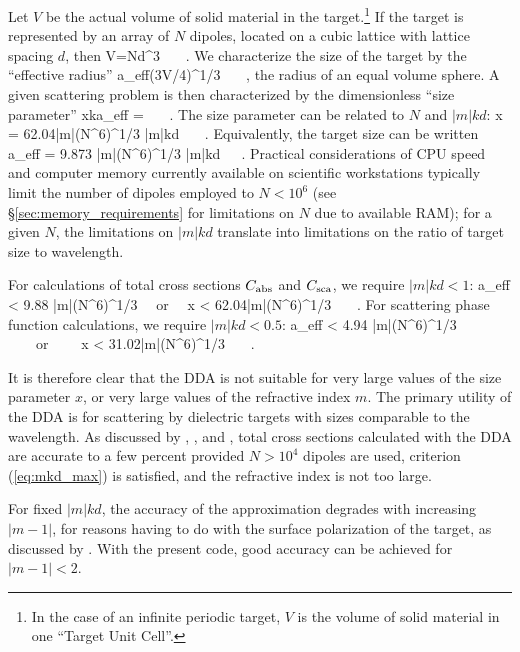 Let $V$ be the actual volume of solid material in the target.\footnote{
   In the case of an infinite periodic target, $V$ is the volume of
   solid material in one ``Target Unit Cell''.}
If the target is represented by an array of $N$ dipoles, located on
a cubic lattice with lattice spacing $d$,
then 
\beq
V=Nd^3 ~~~.
\eeq
We characterize the size of the target by the ``effective radius''
\beq
a_{\rm eff}\equiv(3V/4\pi)^{1/3} ~~~,
\eeq
the radius of an equal volume sphere.
A given scattering problem is then characterized by the
dimensionless ``size parameter''
\beq
x\equiv ka_{\rm eff} =  ~~~.
\eeq
The size parameter can be related to $N$ and $|m|kd$:
\beq
x =
{62.04\over|m|}\left({N^6}\right)^{1/3} \cdot |m|kd ~~~.
\eeq
Equivalently, the target size can be written
\beq
a_{\rm eff} = 9.873 {\lambda\over|m|}\left({N^6}\right)^{1/3}
\cdot |m|kd~~~.
\eeq
Practical considerations of CPU speed and computer memory currently 
available on scientific workstations typically
limit the number
of dipoles employed to $N < 10^6$ (see \S\ref{sec:memory_requirements}
for limitations on $N$ due to available RAM); 
for a given $N$, the limitations on $|m|kd$ 
translate into limitations on the ratio of target size to wavelength.

\noindent
For calculations of total cross sections $C_{\rm abs}$ and $C_{\rm sca}$,
we require $|m|kd < 1$:
\beq
a_{\rm eff} < 9.88 {\lambda\over |m|}\left({N^6}\right)^{1/3}
{\rm ~~or~~} x < {62.04\over|m|}\left({N^6}\right)^{1/3} ~~~.
\eeq
For scattering phase function calculations, we require $|m|kd < 0.5$:
\beq
a_{\rm eff} < 4.94 {\lambda\over |m|}\left({N^6}\right)^{1/3}
{\rm ~~~~or~~~~} x < {31.02\over|m|}\left({N^6}\right)^{1/3} ~~~.
\eeq

It is therefore clear that the DDA is not suitable for very large values of
the size parameter 
$x$, or very large values of the refractive index $m$.
The primary utility of the DDA is for scattering by dielectric 
targets with sizes comparable to the wavelength.
As discussed by \citet{Draine+Goodman_1993}, \citet{Draine+Flatau_1994}, and
\citet{Draine_2000a},
total cross sections calculated with the DDA are 
accurate to a few percent provided
$N>10^4$ dipoles are used, criterion (\ref{eq:mkd_max}) is satisfied,
and the refractive index is not too large. 

For fixed $|m|kd$, the
accuracy of the approximation degrades with increasing $|m-1|$,
for reasons having to do with the surface polarization of the target,
as discussed by \citet{Collinge+Draine_2004}.
With the present code, good accuracy can be achieved for $|m-1| < 2$.


